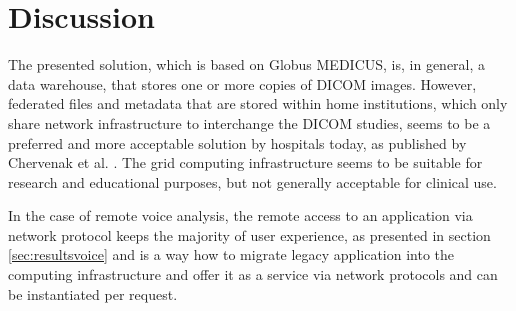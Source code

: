\chapter{Discussion}
\label{sec:discussion}



The presented solution, which is based on Globus MEDICUS, is, in general, a data warehouse, that stores one or more copies of DICOM images. However, federated files and metadata that are stored within home institutions, which only share network infrastructure to interchange the DICOM studies, seems to be a preferred and more acceptable solution by hospitals today, as published by Chervenak et al. \cite{Chervenak2012}. The grid computing infrastructure seems to be suitable for research and educational purposes, but not generally acceptable for clinical use. 
 
In the case of remote voice analysis, the remote access to an application via network protocol keeps the majority of user experience, as presented in section \ref{sec:resultsvoice} and is a way how to migrate legacy application into the computing infrastructure and offer it as a service via network protocols and can be instantiated per request.


